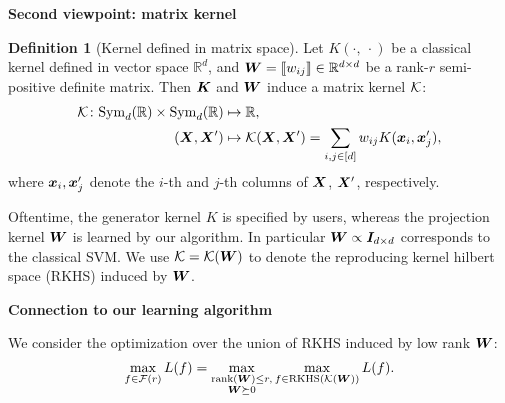 \documentclass[11pt]{article}
\theoremstyle{plain}
\theoremstyle{definition}
\newtheorem{defn}{Definition}
\begin{document}
{\bf Second viewpoint: matrix kernel}

\begin{defn}[Kernel defined in matrix space] Let $K(\cdot,\ \cdot)$ be a classical kernel defined in vector space $\mathbb{R}^d$, and $\bm{W}=\llbracket w_{ij} \rrbracket\in\mathbb{R}^{d\times d}$ be a rank-$r$ semi-positive definite matrix. Then $\bm K$ and $\bm{W}$ induce a matrix kernel $\mathcal{K}$:
\begin{align}
\mathcal{K} \colon\text{Sym}_d(\mathbb{R})\times \text{Sym}_d(\mathbb{R}) &\mapsto \mathbb{R},\\
(\bm X,\bm X')&\mapsto\mathcal{K}(\bm X,\bm X')= \sum_{i,j\in[d]}w_{ij}K(\bm x_i,\bm x'_j),
\end{align}
where $\bm x_i, \bm x'_j$ denote the $i$-th and $j$-th columns of $\bm X$, $\bm X'$, respectively. 
\end{defn}

Oftentime, the generator kernel $K$ is specified by users, whereas the projection kernel $\bm{W}$ is learned by our algorithm. In particular $\bm{W}\propto \bm I_{d\times d}$ corresponds to the classical SVM. We use $\mathcal{K}=\mathcal{K}(\bm{W})$ to denote the reproducing kernel hilbert space (RKHS) induced by $\bm{W}$. 

{\bf Connection to our learning algorithm}

We consider the optimization over the union of RKHS induced by low rank $\bm{W}$: 
\[
\max_{f\in\mathcal{F}(r)}L(f) = \max_{\substack{ \text{rank}(\bm{W})\leq r,\\ \bm{W} \succeq 0}}\max_{f\in \text{RKHS}(\mathcal{K}(\bm{W}))}L(f).
\]
\end{document}
